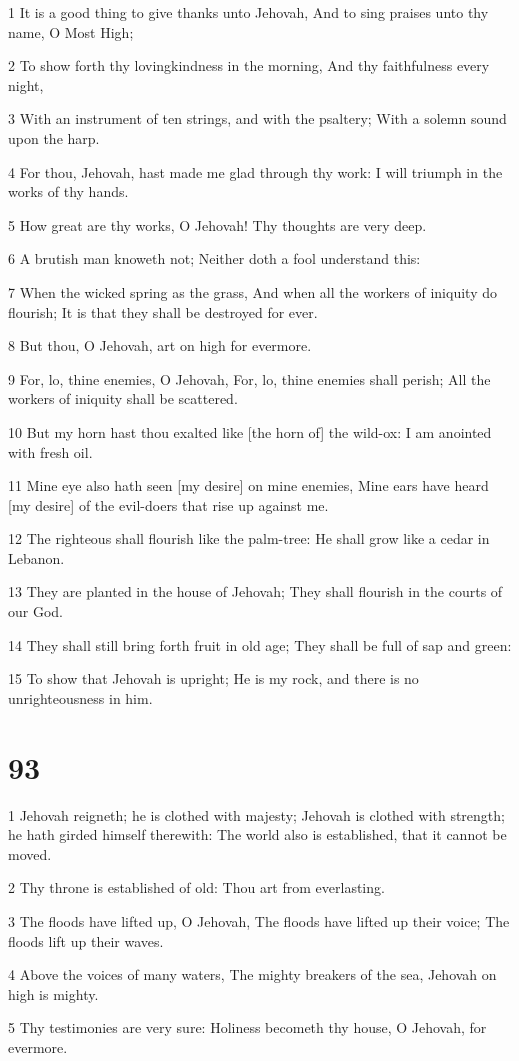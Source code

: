 \par 1 It is a good thing to give thanks unto Jehovah, And to sing praises unto thy name, O Most High;
\par 2 To show forth thy lovingkindness in the morning, And thy faithfulness every night,
\par 3 With an instrument of ten strings, and with the psaltery; With a solemn sound upon the harp.
\par 4 For thou, Jehovah, hast made me glad through thy work: I will triumph in the works of thy hands.
\par 5 How great are thy works, O Jehovah! Thy thoughts are very deep.
\par 6 A brutish man knoweth not; Neither doth a fool understand this:
\par 7 When the wicked spring as the grass, And when all the workers of iniquity do flourish; It is that they shall be destroyed for ever.
\par 8 But thou, O Jehovah, art on high for evermore.
\par 9 For, lo, thine enemies, O Jehovah, For, lo, thine enemies shall perish; All the workers of iniquity shall be scattered.
\par 10 But my horn hast thou exalted like [the horn of] the wild-ox: I am anointed with fresh oil.
\par 11 Mine eye also hath seen [my desire] on mine enemies, Mine ears have heard [my desire] of the evil-doers that rise up against me.
\par 12 The righteous shall flourish like the palm-tree: He shall grow like a cedar in Lebanon.
\par 13 They are planted in the house of Jehovah; They shall flourish in the courts of our God.
\par 14 They shall still bring forth fruit in old age; They shall be full of sap and green:
\par 15 To show that Jehovah is upright; He is my rock, and there is no unrighteousness in him.

\chapter{93}

\par 1 Jehovah reigneth; he is clothed with majesty; Jehovah is clothed with strength; he hath girded himself therewith: The world also is established, that it cannot be moved.
\par 2 Thy throne is established of old: Thou art from everlasting.
\par 3 The floods have lifted up, O Jehovah, The floods have lifted up their voice; The floods lift up their waves.
\par 4 Above the voices of many waters, The mighty breakers of the sea, Jehovah on high is mighty.
\par 5 Thy testimonies are very sure: Holiness becometh thy house, O Jehovah, for evermore.

